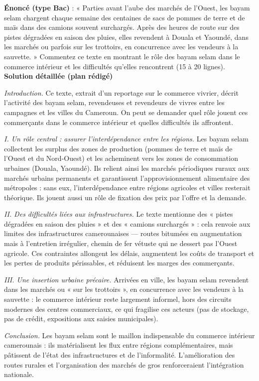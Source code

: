 \documentclass[11pt]{article}
\newcommand{\cle}[1]{{\popxbold\color{popdark}#1}}
\begin{document}
\begin{exoresolu}
\textbf{Énoncé (type Bac)} : « Parties avant l'aube des marchés de l'Ouest, les bayam selam chargent chaque semaine des centaines de sacs de pommes de terre et de maïs dans des camions souvent surchargés. Après des heures de route sur des pistes dégradées en saison des pluies, elles revendent à Douala et Yaoundé, dans les marchés ou parfois sur les trottoirs, en concurrence avec les vendeurs à la sauvette. » Commentez ce texte en montrant le rôle des bayam selam dans le commerce intérieur et les difficultés qu'elles rencontrent (15 à 20 lignes).
\tcblower
\textbf{Solution détaillée (plan rédigé)}

\emph{Introduction.} Ce texte, extrait d'un reportage sur le commerce vivrier, décrit l'activité des \cle{bayam selam}, revendeuses et revendeurs de vivres entre les campagnes et les villes du Cameroun. On peut se demander quel rôle jouent ces commerçants dans le commerce intérieur et quelles difficultés ils affrontent.

\emph{I. Un rôle central : assurer l'interdépendance entre les régions.} Les bayam selam collectent les surplus des zones de production (pommes de terre et maïs de l'Ouest et du Nord-Ouest) et les acheminent vers les zones de consommation urbaines (Douala, Yaoundé). Ils relient ainsi les marchés périodiques ruraux aux marchés urbains permanents et garantissent l'approvisionnement alimentaire des métropoles : sans eux, l'interdépendance entre régions agricoles et villes resterait théorique. Ils jouent aussi un rôle de fixation des prix par l'offre et la demande.

\emph{II. Des difficultés liées aux infrastructures.} Le texte mentionne des « pistes dégradées en saison des pluies » et des « camions surchargés » : cela renvoie aux limites des infrastructures camerounaises — routes bitumées en augmentation mais à l'entretien irrégulier, chemin de fer vétuste qui ne dessert pas l'Ouest agricole. Ces contraintes allongent les délais, augmentent les coûts de transport et les pertes de produits périssables, et réduisent les marges des commerçants.

\emph{III. Une insertion urbaine précaire.} Arrivées en ville, les bayam selam revendent dans les marchés ou « sur les trottoirs », en concurrence avec les \cle{vendeurs à la sauvette} : le commerce intérieur reste largement informel, hors des circuits modernes des centres commerciaux, ce qui fragilise ces acteurs (pas de stockage, pas de crédit, expositions aux saisies municipales).

\emph{Conclusion.} Les bayam selam sont le maillon indispensable du commerce intérieur camerounais : ils matérialisent les flux entre régions complémentaires, mais pâtissent de l'état des infrastructures et de l'informalité. L'amélioration des routes rurales et l'organisation des marchés de gros renforceraient l'intégration nationale.
\end{exoresolu}
\end{document}
